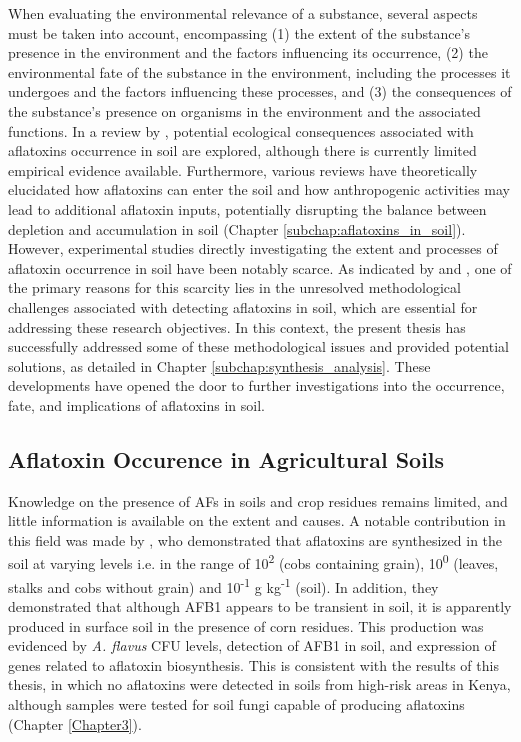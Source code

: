 When evaluating the environmental relevance of a substance, several aspects must be taken into account, encompassing (1) the extent of the substance's presence in the environment and the factors influencing its occurrence, (2) the environmental fate of the substance in the environment, including the processes it undergoes and the factors influencing these processes, and (3) the consequences of the substance's presence on organisms in the environment and the associated functions. In a review by \citet{fouche2020aflatoxins}, potential ecological consequences associated with aflatoxins occurrence in soil are explored, although there is currently limited empirical evidence available. Furthermore, various reviews \citep{fouche2020aflatoxins, elmholt2008mycotoxins, juraschek2022mycotoxins} have theoretically elucidated how aflatoxins can enter the soil and how anthropogenic activities may lead to additional aflatoxin inputs, potentially disrupting the balance between depletion and accumulation in soil (Chapter \ref{subchap:aflatoxins_in_soil}). However, experimental studies directly investigating the extent and processes of aflatoxin occurrence in soil have been notably scarce. As indicated by \citet{elmholt2008mycotoxins} and \citet{abbas2009ecology}, one of the primary reasons for this scarcity lies in the unresolved methodological challenges associated with detecting aflatoxins in soil, which are essential for addressing these research objectives. In this context, the present thesis has successfully addressed some of these methodological issues and provided potential solutions, as detailed in Chapter \ref{subchap:synthesis_analysis}. These developments have opened the door to further investigations into the occurrence, fate, and implications of aflatoxins in soil.

\subsection{Aflatoxin Occurence in Agricultural Soils}

Knowledge on the presence of AFs in soils and crop residues remains limited, and little information is available on the extent and causes. A notable contribution in this field was made by \citet{accinelli2008aspergillus}, who demonstrated that aflatoxins are synthesized in the soil at varying levels i.e. in the range of 10\textsuperscript{2} (cobs containing grain), 10\textsuperscript{0} (leaves, stalks and cobs without grain) and 10\textsuperscript{-1} \textmu g kg\textsuperscript{-1} (soil). In addition, they demonstrated that although AFB1 appears to be transient in soil, it is apparently produced in surface soil in the presence of corn residues. This production was evidenced by \textit{A. flavus} CFU levels, detection of AFB1 in soil, and expression of genes related to aflatoxin biosynthesis. This is consistent with the results of this thesis, in which no aflatoxins were detected in soils from high-risk areas in Kenya, although samples were tested for soil fungi capable of producing aflatoxins (Chapter \ref{Chapter3}).


